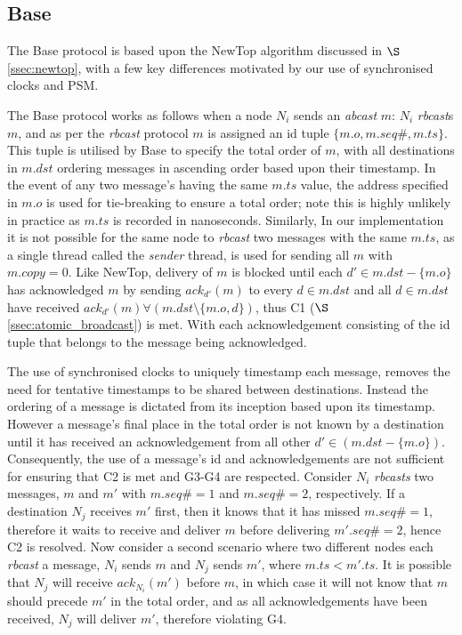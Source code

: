    \subsection{Base}
    The \textsf{Base} protocol is based upon the NewTop \citep{Ezhilchelvan:1995:NFG:876885.880005} algorithm discussed in $\S$ \ref{ssec:newtop}, with a few key differences motivated by our use of synchronised clocks and PSM.  
    
    The \textsf{Base} protocol works as follows when a node $N_i$ sends an \emph{abcast} $m$: $N_i$ \emph{rbcast}s $m$, and as per the \emph{rbcast} protocol $m$ is assigned an id tuple $\{m.o, m.seq\#, m.ts\}$.  This tuple is utilised by \textsf{Base} to specify the total order of $m$, with all destinations in $m.dst$ ordering messages in ascending order based upon their timestamp.  In the event of any two message's having the same $m.ts$ value, the address specified in $m.o$ is used for tie-breaking to ensure a total order; note this is highly unlikely in practice as $m.ts$ is recorded in nanoseconds.  Similarly, In our implementation it is not possible for the same node to \emph{rbcast} two messages with the same $m.ts$, as a single thread called the \emph{sender} thread, is used for sending all $m$ with $m.copy = 0$.  Like NewTop, delivery of $m$ is blocked until each $d' \in m.dst - \{m.o\}$ has acknowledged $m$ by sending $ack_{d'}(m)$ to every $d \in m.dst$ and all $d \in m.dst$ have received $ack_{d'}(m) \forall (m.dst \setminus \{m.o,d\})$, thus C1 ($\S$ \ref{ssec:atomic_broadcast}) is met.  With each acknowledgement consisting of the id tuple that belongs to the message being acknowledged.  
    
    The use of synchronised clocks to uniquely timestamp each message, removes the need for tentative timestamps to be shared between destinations.  Instead the ordering of a message is dictated from its inception based upon its timestamp.  However a message's final place in the total order is not known by a destination until it has received an acknowledgement from all other $d' \in (m.dst - \{m.o\})$.  Consequently, the use of a message's id and acknowledgements are not sufficient for ensuring that C2 is met and G3-G4 are respected.  Consider $N_i$ \emph{rbcasts} two messages, $m$ and $m'$ with $m.seq\# = 1$ and $m.seq\# = 2$, respectively.  If a destination $N_j$ receives $m'$ first, then it knows that it has missed $m.seq\# = 1$, therefore it waits to receive and deliver $m$ before delivering $m'.seq\# = 2$, hence C2 is resolved.  Now consider a second scenario where two different nodes each \emph{rbcast} a message, $N_i$ sends $m$ and $N_j$ sends $m'$, where $m.ts < m'.ts$.  It is possible that $N_j$ will receive $ack_{N_i}(m')$ before $m$, in which case it will not know that $m$ should precede $m'$ in the total order, and as all acknowledgements have been received, $N_j$ will deliver $m'$, therefore violating G4.  
    
